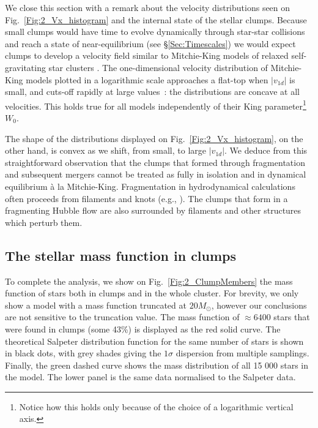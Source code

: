 We close this section with a remark about the velocity distributions seen on Fig.~\ref{Fig:2_Vx_histogram} and the internal state of the stellar clumps. Because small clumps would have time to evolve dynamically through star-star collisions and reach a state of near-equilibrium (see \S\ref{Sec:Timescales}) we would expect clumps to develop a velocity field similar to Mitchie-King models of  relaxed self-gravitating star clusters \citep{BT}.  The one-dimensional velocity distribution of Mitchie-King models plotted in a logarithmic scale approaches a flat-top when $|v_{1d}|$ is small,  and cuts-off rapidly at large values~: the distributions are  concave at all velocities. This holds true for all models independently of their King parameter\footnote{Notice how this holds only because of the choice of a logarithmic vertical axis.} $W_0$. 

The shape of the distributions displayed on Fig.~\ref{Fig:2_Vx_histogram}, on the other hand, is convex as we shift, from small, to large $|v_{1d}|$. We deduce from this straightforward observation that the clumps that formed through fragmentation and subsequent mergers cannot be treated as fully in isolation and in dynamical equilibrium \`a la Mitchie-King.  Fragmentation in hydrodynamical calculations often proceeds from filaments and knots  (e.g., \citealt{Klessen2001,MacLow2004,Maschberger2010,Bate2014}). The clumps that form in a fragmenting  Hubble  flow are also surrounded by filaments and other structures which perturb them.




\subsection{The stellar mass function in clumps} 



To complete the analysis, we show on Fig.~\ref{Fig:2_ClumpMembers} the mass function of stars both in clumps and in the whole cluster. For brevity, we only show a model with a mass function truncated at $20 M_\odot$, however our conclusions are not sensitive to the truncation value. The mass function of $\approx 6400$ stars that were found in clumps (some 43\%) is displayed as the red solid curve. The theoretical Salpeter distribution function for the same number of stars is shown in black dots, with grey shades giving the  $1 \sigma$ dispersion from multiple samplings. Finally, the green dashed curve  shows the mass distribution of all 15 000 stars in the model. The lower panel is the same data normalised to the Salpeter data. 


